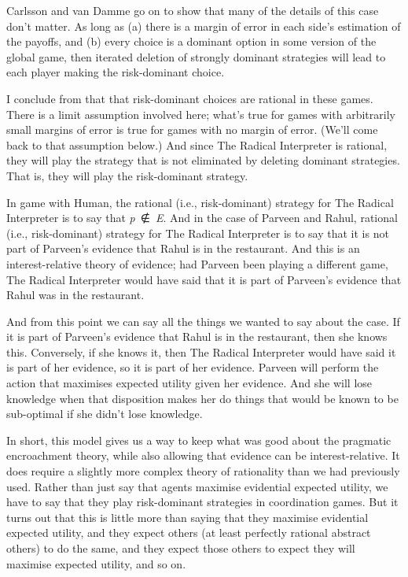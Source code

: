 \documentclass[
  10pt,
  letterpaper,
  DIV=11,
  numbers=noendperiod,
  twoside]{scrartcl}
\begin{document}
Carlsson and van Damme go on to show that many of the details of this
case don't matter. As long as (a) there is a margin of error in each
side's estimation of the payoffs, and (b) every choice is a dominant
option in some version of the global game, then iterated deletion of
strongly dominant strategies will lead to each player making the
risk-dominant choice.

I conclude from that that risk-dominant choices are rational in these
games. There is a limit assumption involved here; what's true for games
with arbitrarily small margins of error is true for games with no margin
of error. (We'll come back to that assumption below.) And since The
Radical Interpreter is rational, they will play the strategy that is not
eliminated by deleting dominant strategies. That is, they will play the
risk-dominant strategy.

In game with Human, the rational (i.e., risk-dominant) strategy for The
Radical Interpreter is to say that \emph{p}~∉~\emph{E}. And in the case
of Parveen and Rahul, rational (i.e., risk-dominant) strategy for The
Radical Interpreter is to say that it is not part of Parveen's evidence
that Rahul is in the restaurant. And this is an interest-relative theory
of evidence; had Parveen been playing a different game, The Radical
Interpreter would have said that it is part of Parveen's evidence that
Rahul was in the restaurant.

And from this point we can say all the things we wanted to say about the
case. If it is part of Parveen's evidence that Rahul is in the
restaurant, then she knows this. Conversely, if she knows it, then The
Radical Interpreter would have said it is part of her evidence, so it is
part of her evidence. Parveen will perform the action that maximises
expected utility given her evidence. And she will lose knowledge when
that disposition makes her do things that would be known to be
sub-optimal if she didn't lose knowledge.

In short, this model gives us a way to keep what was good about the
pragmatic encroachment theory, while also allowing that evidence can be
interest-relative. It does require a slightly more complex theory of
rationality than we had previously used. Rather than just say that
agents maximise evidential expected utility, we have to say that they
play risk-dominant strategies in coordination games. But it turns out
that this is little more than saying that they maximise evidential
expected utility, and they expect others (at least perfectly rational
abstract others) to do the same, and they expect those others to expect
they will maximise expected utility, and so on.
\end{document}
